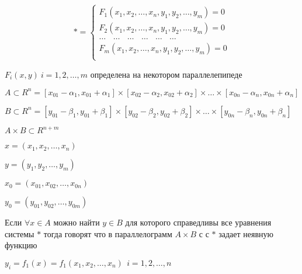 $$
* =
\left\{
\begin{array}{l}
  F_1(x_1, x_2, \ldots, x_n, y_1, y_2, \ldots, y_m) = 0 \\
  F_2(x_1, x_2, \ldots, x_n, y_1, y_2, \ldots, y_m) = 0 \\
  \ldots ~~~~ \ldots ~~~~ \ldots ~~~~ \ldots ~~~~ \ldots ~~~~ \ldots\\
  F_m(x_1, x_2, \ldots, x_n, y_1, y_2, \ldots, y_m) = 0 \\
\end{array}
\right.
$$

\begin{define}
  $F_i (x, y) ~ i = 1,2, \ldots, m$ определена на некотором параллелепипеде

  $A \subset R^n =
  [x_{01} - \alpha_1, x_{01} + \alpha_1] \times
  [x_{02} - \alpha_2, x_{02} + \alpha_2] \times \ldots \times
  [x_{0n} - \alpha_n, x_{0n} + \alpha_n]$

  $B \subset R^n =
  [y_{01} - \beta_1, y_{01} + \beta_1] \times
  [y_{02} - \beta_2, y_{02} + \beta_2] \times \ldots \times
  [y_{0n} - \beta_n, y_{0n} + \beta_n]$

  $A \times B \subset R^{n+m}$

  $x = (x_1, x_2, \ldots, x_n)$

  $y = (y_1, y_2, \ldots, y_m)$

  $x_0 = (x_{01}, x_{02}, \ldots, x_{0n})$

  $y_0 = (y_{01}, y_{02}, \ldots, y_{0m})$

  Если $\forall x \in A$ можно найти $y \in B$ для которого справедливы все
  уравнения системы $*$ тогда говорят  что в параллелограмм $A \times B$ с
  с $*$ задает неявную функцию

  $y_i = f_1(x) = f_1(x_1, x_2, \ldots, x_n) ~~ i = 1, 2, \ldots, n$
\end{define}


